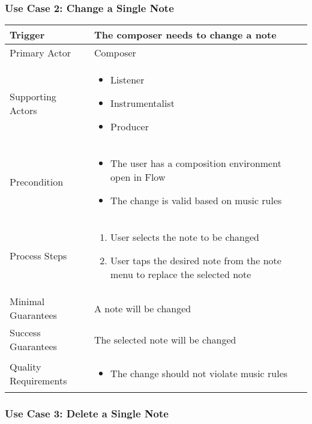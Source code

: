\subsubsection{Use Case 2: Change a Single Note}

\begin{tabularx}{\textwidth}{|X|X|}
\hline
Trigger & 
The composer needs to change a note \\
\hline
Primary Actor & 
Composer\\
\hline
Supporting Actors & 
\begin{itemize}
\item Listener
\item Instrumentalist
\item Producer
\end{itemize} \\
\hline
Precondition & 
\begin{itemize}
\item The user has  a composition environment open in Flow  
\item The change is valid based on music rules
\end{itemize} \\
\hline
Process Steps & 
\begin{enumerate}
\item User selects the note to be changed 
\item User taps the desired note from the note menu to replace the selected note
\end{enumerate} \\
\hline
Minimal Guarantees & 
A note will be changed \\
\hline
Success Guarantees & 
The selected note will be changed \\
\hline
Quality Requirements & 
\begin{itemize}
\item The change should not violate music rules
\end{itemize} \\ 
\hline
\end{tabularx}


\subsubsection{Use Case 3: Delete a Single Note}

